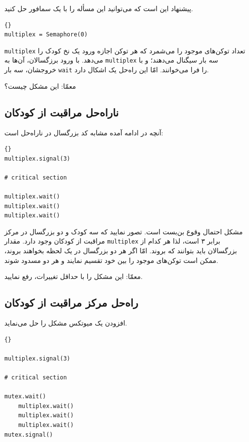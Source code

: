 \documentclass{book}
\newcommand{\clearemptydoublepage}{\newpage\cleardoublepage}
\begin{document}
    پیشنهاد  این است که می‌توانید این مسأله را  با یک سمافور حل کنید. 

\begin{latin}
\begin{lstlisting}[title=\rl{راهنمایی مراقبت از کودکان}]{}
multiplex = Semaphore(0)
\end{lstlisting}
\end{latin}

    {\tt multiplex} 
    تعداد توکن‌های موجود را می‌شمرد که هر توکن اجازه ورود یک نخ کودک را می‌دهد. 
    با ورود برزگسالان، آن‌ها به {\tt multiplex} سه بار سیگنال می‌دهند؛ و با خروجشان، سه بار {\tt wait} را فرا می‌خوانند. 
    امّا این راه‌حل یک اشکال دارد. 

    معمّا: این مشکل چیست؟


\clearemptydoublepage
\subsection {ناراه‌حل مراقبت از کودکان}

    آنچه در ادامه آمده مشابه کد بزرگسال در ناراه‌حل  است: 

\begin{latin}
\begin{lstlisting}[title=\rl{ناراه‌حل مراقبت از کودکان (بزرگسال)}]{}
multiplex.signal(3)

# critical section

multiplex.wait()
multiplex.wait()
multiplex.wait()
\end{lstlisting}
\end{latin}

    مشکل احتمال وقوع بن‌بست است. تصور نمایید که سه کودک و دو بزرگسال در مرکز مراقبت از کودکان وجود دارد. 
    مقدار {\tt multiplex} برابر ۳ است، لذا هر کدام از بزرگسالان باید بتوانند که بروند. 
    امّا اگر هر دو بزرگسال در یک لحظه بخواهند بروند، ممکن است توکن‌های موجود را بین خود تقسیم نمایند و هر دو مسدود شوند. 

    معمّا: این مشکل را با حداقل تغییرات، رفع نمایید. 


\clearemptydoublepage
    \subsection{راه‌حل مرکز مراقبت از کودکان}        

    افزودن یک میوتکس مشکل را حل می‌نماید. 

\begin{latin}
\begin{lstlisting}[title=\rl{راه‌حل مرکز مراقبت از کودکان (بزرگسال)}]{}
     
multiplex.signal(3)

# critical section

mutex.wait()
    multiplex.wait()
    multiplex.wait()
    multiplex.wait()
mutex.signal()
\end{lstlisting}
\end{latin}
\end{document}
